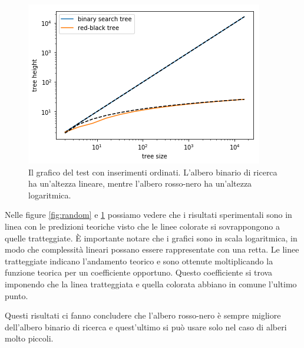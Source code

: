 \documentclass{article}
\begin{document}
\begin{figure}[ht]
    \centering
    \includegraphics{sorted}
    \caption{Il grafico del test con inserimenti ordinati. L'albero binario di ricerca ha un'altezza lineare, mentre l'albero rosso-nero ha un'altezza logaritmica.}
    \label{fig:sorted}
\end{figure}

Nelle figure \ref{fig:random} e \ref{fig:sorted} possiamo vedere che i risultati sperimentali sono in linea con le predizioni teoriche visto che le linee colorate si sovrappongono a quelle tratteggiate. È importante notare che i grafici sono in scala logaritmica, in modo che complessità lineari possano essere rappresentate con una retta. Le linee tratteggiate indicano l'andamento teorico e sono ottenute moltiplicando la funzione teorica per un coefficiente opportuno. Questo coefficiente si trova imponendo che la linea tratteggiata e quella colorata abbiano in comune l'ultimo punto.

Questi risultati ci fanno concludere che l'albero rosso-nero è sempre migliore dell'albero binario di ricerca e quest'ultimo si può usare solo nel caso di alberi molto piccoli.
\end{document}
